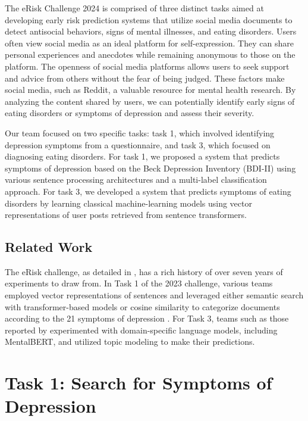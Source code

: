 \documentclass[]{style/ceurart}
\begin{document}
The eRisk Challenge 2024 \cite{parapar_overview_2024, parapar_wn_overview_2024} is comprised of three distinct tasks aimed at developing early risk prediction systems that utilize social media documents to detect antisocial behaviors, signs of mental illnesses, and eating disorders.
Users often view social media as an ideal platform for self-expression. They can share personal experiences and anecdotes while remaining anonymous to those on the platform.
The openness of social media platforms allows users to seek support and advice from others without the fear of being judged.
These factors make social media, such as Reddit, a valuable resource for mental health research.
By analyzing the content shared by users, we can potentially identify early signs of eating disorders or symptoms of depression and assess their severity.

Our team focused on two specific tasks: task 1, which involved identifying depression symptoms from a questionnaire, and task 3, which focused on diagnosing eating disorders.
For task 1, we proposed a system that predicts symptoms of depression based on the Beck Depression Inventory (BDI-II)\cite{beck_beck_1996} using various sentence processing architectures and a multi-label classification approach.
For task 3, we developed a system that predicts symptoms of eating disorders by learning classical machine-learning models using vector representations of user posts retrieved from sentence transformers.

\subsection{Related Work}


The eRisk challenge, as detailed in \citet{crestani_early_2022}, has a rich history of over seven years of experiments to draw from.
In Task 1 of the 2023 challenge\cite{parapar_overview_2023}, various teams employed vector representations of sentences and leveraged either semantic search with transformer-based models or cosine similarity to categorize documents according to the 21 symptoms of depression \cite{recharla_notebook_nodate,wang_notebook_nodate}.
For Task 3, teams such as those reported by \citet{grigore_notebook_nodate} experimented with domain-specific language models, including MentalBERT, and utilized topic modeling to make their predictions.


\section{Task 1: Search for Symptoms of Depression}
\end{document}
